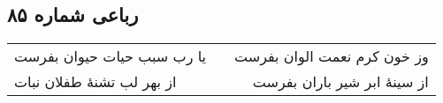 \begin{center}
\section*{رباعی شماره ۸۵}
\label{sec:sh085}
\begin{longtable}{l p{0.5cm} r}
یا رب سبب حیات حیوان بفرست
&&
وز خون کرم نعمت الوان بفرست
\\
از بهر لب تشنهٔ طفلان نبات
&&
از سینهٔ ابر شیر باران بفرست
\\
\end{longtable}
\end{center}
